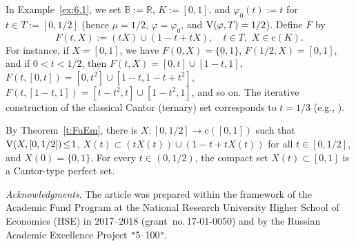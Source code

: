 \documentclass[preprint,12pt]{elsarticle}
\newcommand{\Rb}{\mathbb{R}}  \newcommand{\Nb}{\mathbb{N}}
\newcommand{\nV}{\mbox{\rm V}}
\begin{document}
\begin{exa}
In Example~\ref{ex:6.1}, we set $\mathbb{B}:=\Rb$, $K:=[0,1]$, and
$\varphi_0(t):=t$ for $t\in T:=[0,1/2]$ (hence $\mu=1/2$, $\varphi=\varphi_0$,
and $\nV(\varphi,T)=1/2$). Define $F$ by
  \begin{equation*}
F(t,X):=(tX)\cup(1-t+tX),\quad t\in T,\,\,X\in\mbox{c}(K).
  \end{equation*}
For instance, if $X=[0,1]$, we have $F(0,X)=\{0,1\}$, $F(1/2,X)=[0,1]$, and if
$0<t<1/2$, then $F(t,X)=[0,t]\cup[1-t,1]$, $F(t,[0,t])=[0,t^2]\cup[1-t,1-t+t^2]$,
$F(t,[1-t,1])=[t-t^2,t]\cup[1-t^2,1]$, and so on. The iterative construction of the
classical Cantor (ternary) set corresponds to $t=1/3$ (e.g., \cite[p.~20]{GK}).

By Theorem~\ref{t:FuEm}, there is $X:[0,1/2]\to\mbox{c}([0,1])$ such that
$\nV(X,[0,1/2])\!\le\!1$, $X(t)\subset(tX(t))\cup(1-t+tX(t))$ for all $t\in[0,1/2]$, and
$X(0)=\{0,1\}$. For every $t\in(0,1/2)$, the compact set $X(t)\subset[0,1]$ is a
Cantor-type perfect set.
\end{exa}

{\it Acknowledgments}.
The article was prepared within the framework of the Academic Fund Program at the
National Research University Higher School of Economics (HSE) in 2017--2018
(grant~no.\,17-01-0050) and by the Russian Academic Excellence Project
\verb|"|5--100\verb|"|.

\end{document}

